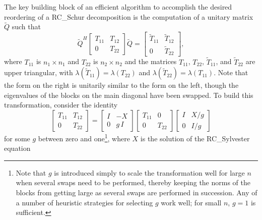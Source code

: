 The key building block of an efficient algorithm to accomplish the desired reordering of a RC_Schur decomposition is the computation of a unitary matrix $\tilde Q$ such that
\begin{equation}
  \tilde Q^H \begin{bmatrix} T_{11} & T_{12} \\  0 & T_{22} \end{bmatrix} \tilde Q = \begin{bmatrix} \tilde T_{11} & \tilde T_{12} \\  0 & \tilde T_{22} \end{bmatrix},
  \label{blockswap}
\end{equation}
where $T_{11}$ is $n_1 \times n_1$ and $T_{22}$ is $n_2 \times n_2$ and the matrices $T_{11}$, $T_{22}$, $\tilde T_{11}$, and $\tilde T_{22}$ are upper triangular,
with $\lambda(\tilde T_{11})=\lambda(T_{22})$ and $\lambda(\tilde T_{22})=\lambda(T_{11})$.  
Note that the form on the right is unitarily similar to the form on
the left, though the eigenvalues of the blocks on the main diagonal have been swapped.
To build this transformation, consider the identity
\begin{equation}
  \begin{bmatrix} T_{11} & T_{12} \\ 0 & T_{22} \end{bmatrix} =
  \begin{bmatrix} I & -X \\ 0 & g\, I \end{bmatrix} \begin{bmatrix} T_{11} & 0 \\ 0 & T_{22} \end{bmatrix} \begin{bmatrix} I & X/g \\ 0 & I/g \end{bmatrix}
    \label{blockswap2}  
\end{equation}
for some $g$ between zero and one\footnote{Note that $g$ is introduced simply to scale the transformation well for large $n$ when several swaps need
to be performed, thereby keeping the norms
of the blocks from getting large as several swaps are performed in succession.  Any of a number of heuristic strategies for selecting $g$ work well;
for small $n$, $g=1$ is sufficient.}, where $X$ is the solution of the RC_Sylvester equation
